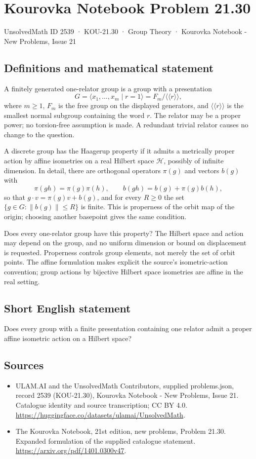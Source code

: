 \documentclass[11pt,a4paper]{article}
\begin{document}
\section*{Kourovka Notebook Problem 21.30}\label{2539}
{\small UnsolvedMath ID 2539 · KOU-21.30 · Group Theory · Kourovka Notebook - New Problems, Issue 21}
\subsection{Definitions and mathematical statement}
A finitely generated one-relator group is a group with a presentation
\[
 G=\langle x_1,\ldots,x_m\mid r=1\rangle
       =F_m/\langle\!\langle r\rangle\!\rangle,
\]
where $m\ge1$, $F_m$ is the free group on the displayed generators,
and $\langle\!\langle r\rangle\!\rangle$ is the smallest normal subgroup
containing the word $r$. The relator may be a proper power; no torsion-free
assumption is made. A redundant trivial relator causes no change to the
question.

A discrete group has the Haagerup property if it admits a metrically
proper action by affine isometries on a real Hilbert space $\mathcal H$,
possibly of infinite dimension. In detail, there are orthogonal operators
$\pi(g)$ and vectors $b(g)$ with
\[
 \pi(gh)=\pi(g)\pi(h),\qquad
 b(gh)=b(g)+\pi(g)b(h),
\]
so that $g\cdot v=\pi(g)v+b(g)$, and for every $R\ge0$ the set
$\{g\in G:\|b(g)\|\le R\}$ is finite. This is properness of the orbit
map of the origin; choosing another basepoint gives the same condition.

Does every one-relator group have this property? The Hilbert space and
action may depend on the group, and no uniform dimension or bound on
displacement is requested. Properness controls group elements, not merely
the set of orbit points. The affine formulation makes explicit the
source's isometric-action convention; group actions by bijective Hilbert
space isometries are affine in the real setting.
\subsection{Short English statement}
Does every group with a finite presentation containing one relator admit a proper affine isometric action on a Hilbert space?
\subsection{Sources}
\begin{itemize}
\item[S1] ULAM.AI and the UnsolvedMath Contributors, supplied problems.json, record 2539 (KOU-21.30), Kourovka Notebook - New Problems, Issue 21. Catalogue identity and source transcription; CC BY 4.0.
\url{https://huggingface.co/datasets/ulamai/UnsolvedMath}.
\item[S2] The Kourovka Notebook, 21st edition, new problems, Problem 21.30. Expanded formulation of the supplied catalogue statement.
\url{https://arxiv.org/pdf/1401.0300v47}.
\end{itemize}
\end{document}
